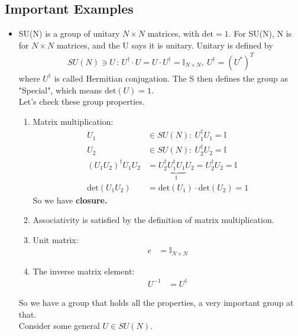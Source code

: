 \documentclass[a4paper, 11pt, normalem]{report}
\begin{document}
\subsection{Important Examples}
\begin{itemize}
    \item SU(N) is a group of unitary $N\times N$ matrices, with $\text{det}=1$. For SU(N), N is for $N\times N$ matrices, and the U says it is unitary.
        Unitary is defined by
        \begin{align}
            SU(N) \ni U\,:\, U^\dagger\cdot U = U\cdot U^\dagger = \mathbb{I}_{N\times N},~ U^\dagger = (U^*)^T
        \end{align}
        where $U^\dagger$ is called Hermitian conjugation.
        The S then defines the group as "Special", which means $\text{det}(U) = 1$.\\
        Let's check these group properties.
        \begin{enumerate}
            \item Matrix multiplication:
                \begin{align}
                    U_1 &\in SU(N):~ U_1^\dagger U_1 = \mathbb{I} \\
                    U_2 &\in SU(N):~ U_2^\dagger U_2 = \mathbb{I} \\
                    (U_1U_2)^\dagger U_1U_2 &= U_2^\dagger \underbrace{U^\dagger_1 U_1}_{\mathbb{I}}U_2 = U^\dagger_2 U_2 = \mathbb{I} \\
                    \text{det}(U_1U_2) &= \text{det}(U_1)\cdot\text{det}(U_2) = 1
                \end{align}
                So we have \textbf{closure.}
            \item Associativity is satisfied by the definition of matrix multiplication.
            \item Unit matrix:
                \begin{align}
                    e &= \mathbb{I}_{N\times N}
                \end{align}
            \item The inverse matrix element:
                \begin{align}
                    U^{-1} &= U^\dagger
                \end{align}
        \end{enumerate}
        So we have a group that holds all the properties, a very important group at that. \\
        Consider some general $U \in SU(N)$.

\end{itemize}
\end{document}
